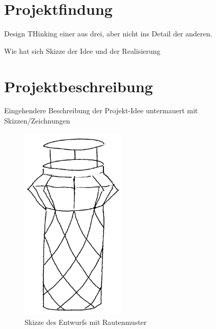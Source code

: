 \chapter{Projektfindung}

    Design THinking einer aus drei, aber nicht ins Detail der anderen.
    
    Wie hat sich Skizze der Idee und der Realisierung

\chapter{Projektbeschreibung}
    
    Eingehendere Beschreibung der Projekt-Idee untermauert mit
    Skizzen/Zeichnungen

    \begin{figure}[h]
        \begin{center}
            \includegraphics[width=5cm]{media/01_project/bin.png}
        \end{center}
        \caption{Skizze des Entwurfs mit Rautenmuster}
        \label{fig:bin_1}
    \end{figure}